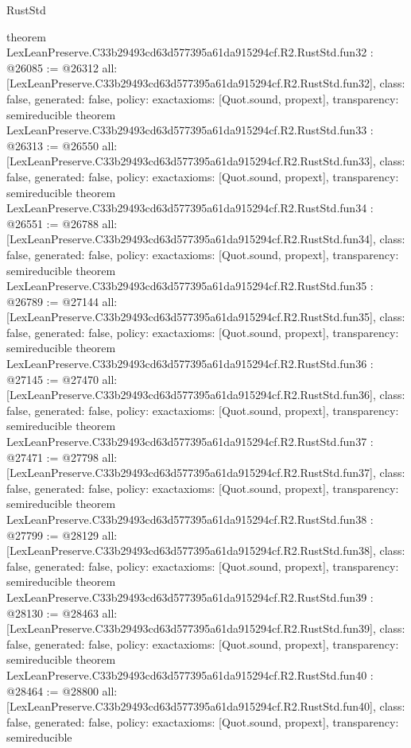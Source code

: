 \begin{lexlean}{RustStd}
\begin{coremodule}
{}
theorem LexLeanPreserve.C33b29493cd63d577395a61da915294cf.R2.RustStd.fun32 : @26085 := @26312 {
  all: [LexLeanPreserve.C33b29493cd63d577395a61da915294cf.R2.RustStd.fun32],
  class: false,
  generated: false,
  policy: exact{axioms: [Quot.sound, propext]},
  transparency: semireducible
}
theorem LexLeanPreserve.C33b29493cd63d577395a61da915294cf.R2.RustStd.fun33 : @26313 := @26550 {
  all: [LexLeanPreserve.C33b29493cd63d577395a61da915294cf.R2.RustStd.fun33],
  class: false,
  generated: false,
  policy: exact{axioms: [Quot.sound, propext]},
  transparency: semireducible
}
theorem LexLeanPreserve.C33b29493cd63d577395a61da915294cf.R2.RustStd.fun34 : @26551 := @26788 {
  all: [LexLeanPreserve.C33b29493cd63d577395a61da915294cf.R2.RustStd.fun34],
  class: false,
  generated: false,
  policy: exact{axioms: [Quot.sound, propext]},
  transparency: semireducible
}
theorem LexLeanPreserve.C33b29493cd63d577395a61da915294cf.R2.RustStd.fun35 : @26789 := @27144 {
  all: [LexLeanPreserve.C33b29493cd63d577395a61da915294cf.R2.RustStd.fun35],
  class: false,
  generated: false,
  policy: exact{axioms: [Quot.sound, propext]},
  transparency: semireducible
}
theorem LexLeanPreserve.C33b29493cd63d577395a61da915294cf.R2.RustStd.fun36 : @27145 := @27470 {
  all: [LexLeanPreserve.C33b29493cd63d577395a61da915294cf.R2.RustStd.fun36],
  class: false,
  generated: false,
  policy: exact{axioms: [Quot.sound, propext]},
  transparency: semireducible
}
theorem LexLeanPreserve.C33b29493cd63d577395a61da915294cf.R2.RustStd.fun37 : @27471 := @27798 {
  all: [LexLeanPreserve.C33b29493cd63d577395a61da915294cf.R2.RustStd.fun37],
  class: false,
  generated: false,
  policy: exact{axioms: [Quot.sound, propext]},
  transparency: semireducible
}
theorem LexLeanPreserve.C33b29493cd63d577395a61da915294cf.R2.RustStd.fun38 : @27799 := @28129 {
  all: [LexLeanPreserve.C33b29493cd63d577395a61da915294cf.R2.RustStd.fun38],
  class: false,
  generated: false,
  policy: exact{axioms: [Quot.sound, propext]},
  transparency: semireducible
}
theorem LexLeanPreserve.C33b29493cd63d577395a61da915294cf.R2.RustStd.fun39 : @28130 := @28463 {
  all: [LexLeanPreserve.C33b29493cd63d577395a61da915294cf.R2.RustStd.fun39],
  class: false,
  generated: false,
  policy: exact{axioms: [Quot.sound, propext]},
  transparency: semireducible
}
theorem LexLeanPreserve.C33b29493cd63d577395a61da915294cf.R2.RustStd.fun40 : @28464 := @28800 {
  all: [LexLeanPreserve.C33b29493cd63d577395a61da915294cf.R2.RustStd.fun40],
  class: false,
  generated: false,
  policy: exact{axioms: [Quot.sound, propext]},
  transparency: semireducible
}
\end{coremodule}
\end{lexlean}
